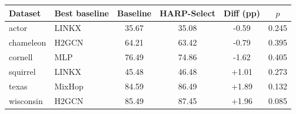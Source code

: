 \begin{tabular*}{0.94\linewidth}{@{\extracolsep{\fill}}llcccc@{}}
\toprule
Dataset & Best baseline & Baseline & HARP-Select & Diff (pp) & $p$ \\
\midrule
actor & LINKX & 35.67 & 35.08 & -0.59 & 0.245 \\
chameleon & H2GCN & 64.21 & 63.42 & -0.79 & 0.395 \\
cornell & MLP & 76.49 & 74.86 & -1.62 & 0.405 \\
squirrel & LINKX & 45.48 & 46.48 & +1.01 & 0.273 \\
texas & MixHop & 84.59 & 86.49 & +1.89 & 0.132 \\
wisconsin & H2GCN & 85.49 & 87.45 & +1.96 & 0.085 \\
\bottomrule
\end{tabular*}

